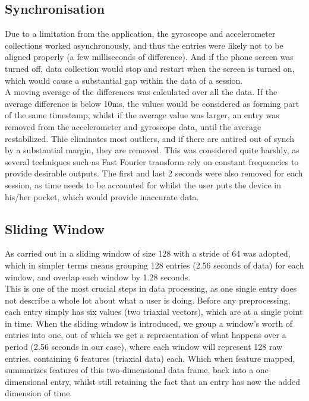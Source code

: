 \subsection{Synchronisation}
Due to a limitation from the application, the gyroscope and accelerometer collections worked asynchronously, and thus the entries were likely not to be aligned properly (a few milliseconds of difference). And if the phone screen was turned off, data collection would stop and restart when the screen is turned on, which would cause a substantial gap within the data of a session.\\
A moving average of the differences was calculated over all the data. If the average difference is below 10ms, the values would be considered as forming part of the same timestamp, whilst if the average value was larger, an entry was removed from the accelerometer and gyroscope data, until the average restabilized. Thie eliminates most outliers, and if there are antired out of synch by a substantial margin, they are removed. This was considered quite harshly, as several techniques such as Fast Fourier transform rely on constant frequencies to provide desirable outputs. 
The first and last 2 seconds were also removed for each session, as time needs to be accounted for whilst the user puts the device in his/her pocket, which would provide inaccurate data. 


\subsection{Sliding Window}
As carried out in \cite{Noor2017} a sliding window of size 128 with a stride of 64 was adopted, which in simpler terms means grouping 128 entries (2.56 seconds of data) for each window, and overlap each window by 1.28 seconds.\\
This is one of the most crucial steps in data processing, as one single entry does not describe a whole lot about what a user is doing. Before any preprocessing, each entry simply has six values (two triaxial vectors), which are at a single point in time. When the sliding window is introduced, we group a window’s worth of entries into one, out of which we get a representation of what happens over a period (2.56 seconds in our case), where each window will represent 128 raw entries, containing 6 features (triaxial data) each. Which when feature mapped, summarizes features of this two-dimensional data frame, back into a one-dimensional entry, whilst still retaining the fact that an entry has now the added dimension of time.

